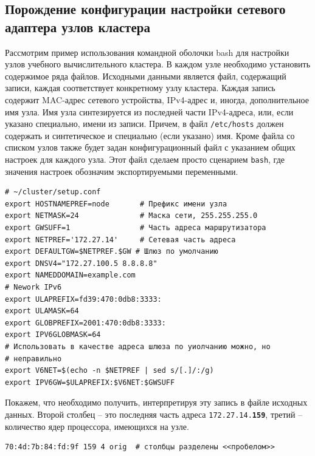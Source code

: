 \documentclass[12pt]{article}
\begin{document}
\subsection{Порождение конфигурации настройки сетевого адаптера узлов кластера}

Рассмотрим пример использования командной оболочки bash для настройки узлов учебного вычислительного кластера. В каждом узле необходимо установить содержимое ряда файлов. Исходными данными является файл, содержащий записи, каждая соответствует конкретному узлу кластера. Каждая запись содержит MAC-адрес сетевого устройства, IPv4-адрес и, иногда, дополнительное имя узла. Имя узла синтезируется из последней части IPv4-адреса, или, если указано специально, имени из записи. Причем, в файл \texttt{/etc/hosts} должен содержать и синтетическое и специально (если указано) имя. Кроме файла со списком узлов также будет задан конфигурационный файл с указанием общих настроек для каждого узла. Этот файл сделаем просто сценарием \texttt{bash}, где значения настроек обозначим экспортируемыми переменными.

\label{conforig}
\begin{verbatim}
# ~/cluster/setup.conf
export HOSTNAMEPREF=node       # Префикс имени узла
export NETMASK=24              # Маска сети, 255.255.255.0
export GWSUFF=1                # Часть адреса маршрутизатора
export NETPREF='172.27.14'     # Сетевая часть адреса
export DEFAULTGW=$NETPREF.$GW # Шлюз по умолчанию
export DNSV4="172.27.100.5 8.8.8.8"
export NAMEDDOMAIN=example.com
# Nework IPv6
export ULAPREFIX=fd39:470:0db8:3333:
export ULAMASK=64
export GLOBPREFIX=2001:470:0db8:3333:
export IPV6GLOBMASK=64
# Использовать в качестве адреса шлюза по уиолчанию можно, но
# неправильно
export V6NET=$(echo -n $NETPREF | sed s/[.]/:/g)
export IPV6GW=$ULAPREFIX:$V6NET:$GWSUFF
\end{verbatim}

Покажем, что необходимо получить, интерпретируя эту запись в файле исходных данных. Второй столбец -- это последняя часть адреса \texttt{172.27.14.\textbf{159}}, третий -- количество ядер процессора, имеющихся на узле.
\begin{verbatim}
70:4d:7b:84:fd:9f 159 4 orig  # столбцы разделены <<пробелом>>
\end{verbatim}
\end{document}
